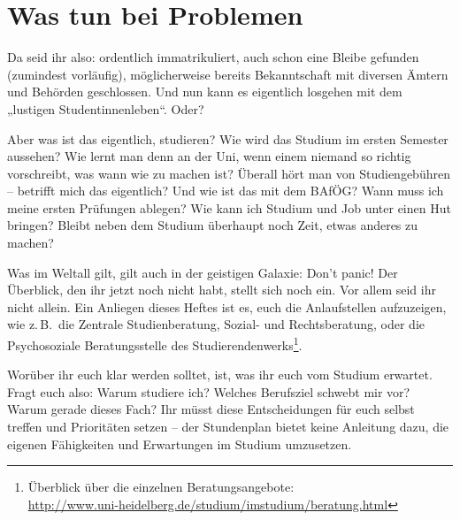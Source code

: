 \newpage
\section{Was tun bei Problemen}
\label{dschungel}
Da seid ihr also: ordentlich immatrikuliert, auch schon eine Bleibe gefunden (zumindest vorläufig), möglicherweise bereits Bekanntschaft mit diversen Ämtern und Behörden geschlossen. Und nun kann es eigentlich losgehen mit dem „lustigen Studentinnenleben“. Oder?

Aber was ist das eigentlich, studieren? Wie wird das Studium im ersten Semester aussehen? Wie lernt man denn an der Uni, wenn einem niemand so richtig vorschreibt, was wann wie zu machen ist? Überall hört man von Studiengebühren -- betrifft mich das eigentlich? Und wie ist das mit dem BAfÖG? Wann muss ich meine ersten Prüfungen ablegen? Wie kann ich Studium und Job unter einen Hut bringen? Bleibt neben dem Studium überhaupt noch Zeit, etwas anderes zu machen?

Was im Weltall gilt, gilt auch in der geistigen Galaxie: Don't panic! Der Überblick, den ihr jetzt noch nicht habt, stellt sich noch ein. Vor allem seid ihr nicht allein. Ein Anliegen dieses Heftes ist es, euch die Anlaufstellen aufzuzeigen, wie z.\,B.\ die Zentrale Studienberatung, Sozial- und Rechtsberatung, oder die Psychosoziale Beratungsstelle des Studierendenwerks\footnote{Überblick über die einzelnen Beratungsangebote:\\\url{http://www.uni-heidelberg.de/studium/imstudium/beratung.html}}.

Worüber ihr euch klar werden solltet, ist, was ihr euch vom Studium erwartet. Fragt euch also: Warum studiere ich? Welches Berufsziel schwebt mir vor? Warum gerade dieses Fach? Ihr müsst diese Entscheidungen für euch selbst treffen und Prioritäten setzen -- der Stundenplan bietet keine Anleitung dazu, die eigenen Fähigkeiten und Erwartungen im Studium umzusetzen.\enlargethispage{\baselineskip}%

